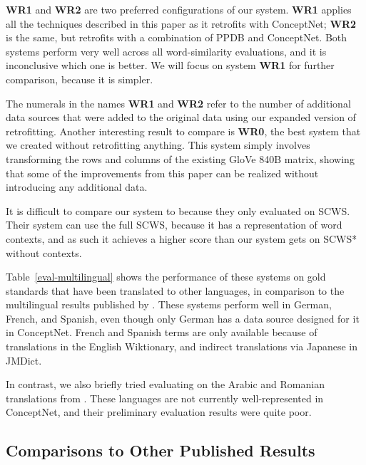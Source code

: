 \documentclass[11pt,letterpaper]{article}
\begin{document}
{\bf WR1} and {\bf WR2} are two preferred configurations of our system. {\bf WR1}
applies all the techniques described in this paper as it retrofits with
ConceptNet; {\bf WR2} is the same, but retrofits with a combination of PPDB and
ConceptNet. Both systems perform very well across all word-similarity
evaluations, and it is inconclusive which one is better. We will focus on
system {\bf WR1} for further comparison, because it is simpler.

The numerals in the names {\bf WR1} and {\bf WR2} refer to the number of
additional data sources that were added to the original data using our expanded
version of retrofitting. Another interesting result to compare is {\bf WR0},
the best system that we created without retrofitting anything. This system
simply involves transforming the rows and columns of the existing GloVe 840B
matrix, showing that some of the improvements from this paper can be realized
without introducing any additional data.

It is difficult to compare our system to  because they only
evaluated on SCWS. Their system can use the full SCWS, because it has a
representation of word contexts, and as such it achieves a higher score than
our system gets on SCWS* without contexts.

Table~\ref{eval-multilingual} shows the performance of these systems on
gold standards that have been translated to other languages, in comparison to
the multilingual results published by .
These systems perform well in German, French, and Spanish, even though only
German has a data source designed for it in ConceptNet. French and Spanish terms
are only available because of translations in the English Wiktionary, and
indirect translations via Japanese in JMDict.

In contrast, we also briefly tried evaluating on the Arabic and Romanian
translations from . These languages are not
currently well-represented in ConceptNet, and their preliminary evaluation
results were quite poor.

\subsection{Comparisons to Other Published Results}
\end{document}
